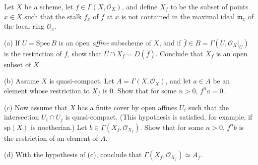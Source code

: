 \begin{exe}
	\label{2.2.16}
	Let $X$ be a scheme, let $f\in\Gamma(X,\mathcal{O}_X)$, and define $X_f$ to be the subset of points $x\in X$ such that the stalk $f_x$ of $f$ at $x$ is not contained in the maximal ideal $\mathfrak{m}_x$ of the local ring $\mathcal{O}_x$.
	
	(a) If $U=\mathrm{Spec}\,B$ is an open \emph{affine} subscheme of $X$, and if $\bar{f}\in B=\Gamma(U,\mathcal{O}_X|_U)$ is the restriction of $f$, show that $U\cap X_f=D(\bar{f})$. Conclude that $X_f$ is an open subset of $X$.
	
	(b) Assume $X$ is quasi-compact. Let $A=\Gamma(X,\mathcal{O}_X)$, and let $a\in A$ be an element whose restriction to $X_f$ is 0. Show that for some $n>0$, $f^na=0$.
	
	(c) Now assume that $X$ has a finite cover by open affines $U_i$ such that the intersection $U_i\cap U_j$ is quasi-compact. (This hypothesis is satisfied, for example, if $\mathrm{sp}(X)$ is noetherian.) Let $b\in\Gamma(X_f,\mathcal{O}_{X_f})$. Show that for some $n>0$, $f^nb$ is the restriction of an element of $A$.
	
	(d) With the hypothesis of (c), conclude that $\Gamma(X_f,\mathcal{O}_{X_f})\simeq A_f$.
\end{exe}
